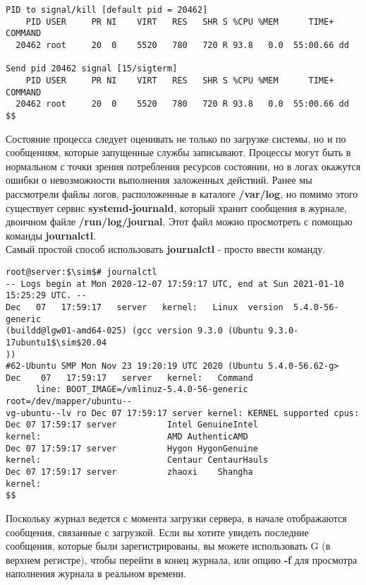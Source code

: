 \documentclass[14pt, a4paper]{article}
\begin{document}
\begin{lstlisting}
PID to signal/kill [default pid = 20462]
    PID USER     PR NI    VIRT   RES   SHR S %CPU %MEM      TIME+ COMMAND
  20462 root     20  0    5520   780   720 R 93.8   0.0  55:00.66 dd

Send pid 20462 signal [15/sigterm]
    PID USER     PR NI    VIRT   RES   SHR S %CPU %MEM      TIME+ COMMAND
  20462 root     20  0    5520   780   720 R 93.8   0.0  55:00.66 dd
$$
\end{lstlisting}
\vspace{0.3cm}

Состояние процесса следует оценивать не только по загрузке системы, но и по сообщениям, которые
запущенные службы записывают. Процессы могут быть в нормальном с точки зрения потребления
ресурсов состоянии, но в логах окажутся ошибки о невозможности выполнения заложенных действий.
Ранее мы рассмотрели файлы логов, расположенные в каталоге \textbf{/var/log}, но помимо этого существует
сервис \textbf{systemd-journald}, который хранит сообщения в журнале, двоичном файле \textbf{/run/log/journal}.
Этот файл можно просмотреть с помощью команды \textbf{journalctl}.\\

Самый простой способ использовать \textbf{journalctl} - просто ввести команду.

\vspace{0.3cm}
\begin{lstlisting}
root@server:$\sim$# journalctl
-- Logs begin at Mon 2020-12-07 17:59:17 UTC, end at Sun 2021-01-10 
15:25:29 UTC. --
Dec   07   17:59:17   server   kernel:   Linux  version  5.4.0-56-generic
(buildd@lgw01-amd64-025) (gcc version 9.3.0 (Ubuntu 9.3.0-17ubuntu1$\sim$20.04
))
#62-Ubuntu SMP Mon Nov 23 19:20:19 UTC 2020 (Ubuntu 5.4.0-56.62-g>
Dec    07   17:59:17   server   kernel:   Command
      line: BOOT_IMAGE=/vmlinuz-5.4.0-56-generic root=/dev/mapper/ubuntu--
vg-ubuntu--lv ro Dec 07 17:59:17 server kernel: KERNEL supported cpus:
Dec 07 17:59:17 server          Intel GenuineIntel
kernel:                         AMD AuthenticAMD
Dec 07 17:59:17 server          Hygon HygonGenuine
kernel:                         Centaur CentaurHauls
Dec 07 17:59:17 server          zhaoxi    Shangha
kernel:
$$
\end{lstlisting}
\vspace{0.2cm}

Поскольку журнал ведется с момента загрузки сервера, в начале отображаются сообщения,
связанные с загрузкой. Если вы хотите увидеть последние сообщения, которые были
зарегистрированы, вы можете использовать G (в верхнем регистре), чтобы перейти в конец журнала,
или опцию \textbf{-f} для просмотра наполнения журнала в реальном времени.\\
\end{document}
